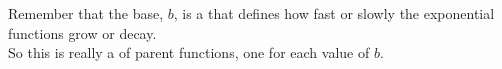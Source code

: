 \begin{tcolorbox}[center,width=5.5in,colback=white,]
    \small
    Remember that the base, $b$, is a  
    that defines how fast or slowly the {\myEmph exponential functions }
    grow or decay.\\[0.5\onelineskip]
    So this is really a  of parent functions, 
    one for each value of $b$.
\end{tcolorbox}


